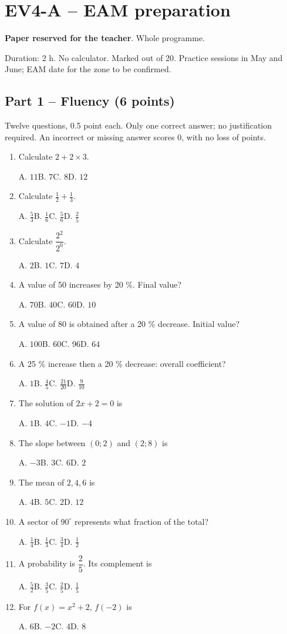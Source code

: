 \clearpage\section*{EV4-A -- EAM preparation}\label{EV4-A}
\textbf{Paper reserved for the teacher}. Whole programme.\par Duration: 2 h. No calculator. Marked out of 20. Practice sessions in May and June; EAM date for the zone to be confirmed.
\subsection*{Part 1 -- Fluency (6 points)}
Twelve questions, 0.5 point each. Only one correct answer; no justification required. An incorrect or missing answer scores 0, with no loss of points.
\begin{enumerate}
\item Calculate $2+2\times3$.\par A. $11$\quad B. $7$\quad C. $8$\quad D. $12$
\item Calculate $\frac12+\frac13$.\par A. $\frac{5}{3}$\quad B. $\frac{1}{6}$\quad C. $\frac{5}{6}$\quad D. $\frac{2}{5}$
\item Calculate $\dfrac{2^2}{2^{0}}$.\par A. $2$\quad B. $1$\quad C. $7$\quad D. $4$
\item A value of 50 increases by 20 \%. Final value?\par A. $70$\quad B. $40$\quad C. $60$\quad D. $10$
\item A value of 80 is obtained after a 20 \% decrease. Initial value?\par A. $100$\quad B. $60$\quad C. $96$\quad D. $64$
\item A 25 \% increase then a 20 \% decrease: overall coefficient?\par A. $1$\quad B. $\frac{4}{5}$\quad C. $\frac{21}{20}$\quad D. $\frac{9}{10}$
\item The solution of $2x+2=0$ is\par A. $1$\quad B. $4$\quad C. $-1$\quad D. $-4$
\item The slope between $(0;2)$ and $(2;8)$ is\par A. $-3$\quad B. $3$\quad C. $6$\quad D. $2$
\item The mean of $2, 4, 6$ is\par A. $4$\quad B. $5$\quad C. $2$\quad D. $12$
\item A sector of $90^\circ$ represents what fraction of the total?\par A. $\frac{1}{4}$\quad B. $\frac{1}{3}$\quad C. $\frac{3}{4}$\quad D. $\frac{1}{2}$
\item A probability is $\dfrac{2}{5}$. Its complement is\par A. $\frac{5}{2}$\quad B. $\frac{3}{5}$\quad C. $\frac{2}{5}$\quad D. $\frac{1}{5}$
\item For $f(x)=x^2+2$, $f(-2)$ is\par A. $6$\quad B. $-2$\quad C. $4$\quad D. $8$
\end{enumerate}
